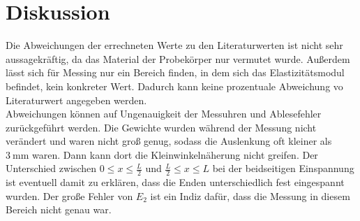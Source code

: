 \section{Diskussion}
\label{sec:Diskussion}
Die Abweichungen der errechneten Werte zu den Literaturwerten ist nicht sehr aussagekräftig, da das Material der Probekörper nur vermutet wurde.
Außerdem lässt sich für Messing nur ein Bereich finden, in dem sich das Elastizitätsmodul befindet, kein konkreter Wert.
Dadurch kann keine prozentuale Abweichung vo Literaturwert angegeben werden.\\

Abweichungen können auf Ungenauigkeit der Messuhren und Ablesefehler zurückgeführt werden.
Die Gewichte wurden während der Messung nicht verändert und waren nicht groß genug, sodass die Auslenkung oft kleiner als $\SI{3}{\milli\metre}$ waren.
Dann kann dort die Kleinwinkelnäherung nicht greifen.
Der Unterschied zwischen $0 \leq x \leq \frac{L}{2}$ und $\frac{L}{2}\leq x\leq L$ bei der beidseitigen Einspannung ist eventuell damit zu erklären, 
dass die Enden unterschiedlich fest eingespannt wurden. 
Der große Fehler von $E_2$ ist ein Indiz dafür, dass die Messung in diesem Bereich nicht genau war.

